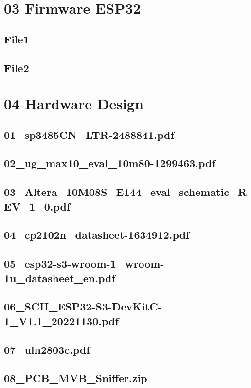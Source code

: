 \section{03 Firmware ESP32}
\label{app:Odner4}
\subsection{File1}
\label{app:File41}
\subsection{File2}
\label{app:File42}

\section{04 Hardware Design}
\label{app:Odner5}
\subsection{01\_sp3485CN\_LTR-2488841.pdf}
\label{app:File51}
\subsection{02\_ug\_max10\_eval\_10m80-1299463.pdf}
\label{app:File52}
\subsection{03\_Altera\_10M08S\_E144\_eval\_schematic\_REV\_1\_0.pdf}
\label{app:File53}
\subsection{04\_cp2102n\_datasheet-1634912.pdf}
\label{app:File54}
\subsection{05\_esp32-s3-wroom-1\_wroom-1u\_datasheet\_en.pdf}
\label{app:File55}
\subsection{06\_SCH\_ESP32-S3-DevKitC-1\_V1.1\_20221130.pdf}
\label{app:File56}
\subsection{07\_uln2803c.pdf}
\label{app:File57}
\subsection{08\_PCB\_MVB\_Sniffer.zip}
\label{app:File58}

